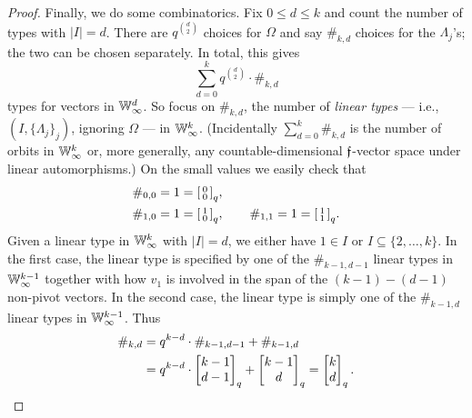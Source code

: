 \begin{proof}
    Finally, we do some combinatorics.
    Fix $0 \leq d \leq k$ and count the number of types with $|I| = d$.
    There are $q^{\binom{d}{2}}$ choices for $\Omega$ and say $\#_{k, d}$ choices for the $\Lambda_j$'s;
    the two can be chosen separately.
    In total, this gives
    \[ 
        \sum_{d=0}^k q^{\binom{d}{2}} \cdot \#_{k, d} 
    \]
    types for vectors in $\mathbb{W}_\infty^d$.
    So focus on $\#_{k, d}$, the number of \emph{linear types} --- i.e., $(I, \{\Lambda_j\}_j)$, ignoring $\Omega$ --- in $\mathbb{W}_\infty^k$.
    (Incidentally $\sum_{d=0}^k \#_{k, d}$ is the number of orbits in $\mathbb{W}_\infty^k$ or, more generally, any countable-dimensional $\mathfrak{f}$-vector space under linear automorphisms.)
    On the small values we easily check that \begin{align*}
        &\#_{0, 0} = 1 = \begin{bsmallmatrix}0 \\ 0\end{bsmallmatrix}_q, \\
        &\#_{1, 0} = 1 = \begin{bsmallmatrix}1 \\ 0\end{bsmallmatrix}_q,\qquad
        \#_{1, 1} = 1 = \begin{bsmallmatrix}1 \\ 1\end{bsmallmatrix}_q.
    \end{align*}
    Given a linear type in $\mathbb{W}_\infty^k$ with $\vert I \vert = d$, 
    we either have $1 \in I$ or $I \subseteq \{2, \ldots, k\}$.
    In the first case, the linear type is specified by one of the $\#_{k-1, d-1}$ linear types in $\mathbb{W}_\infty^{k-1}$
    together with how $v_1$ is involved in the span of the $(k - 1) - (d - 1)$ non-pivot vectors.
    In the second case, the linear type is simply one of the $\#_{k-1, d}$ linear types in $\mathbb{W}_\infty^{k-1}$.
    Thus 
    \begin{align*}
        \#_{k, d} 
        &= q^{k-d} \cdot \#_{k-1, d-1} + \#_{k-1, d} \\
        &= q^{k-d} \cdot \begin{bmatrix}k-1 \\ d-1\end{bmatrix}_q + \begin{bmatrix}k-1 \\ d\end{bmatrix}_q
        = \begin{bmatrix}k \\ d\end{bmatrix}_q.
        \qedhere
    \end{align*}
\end{proof}

